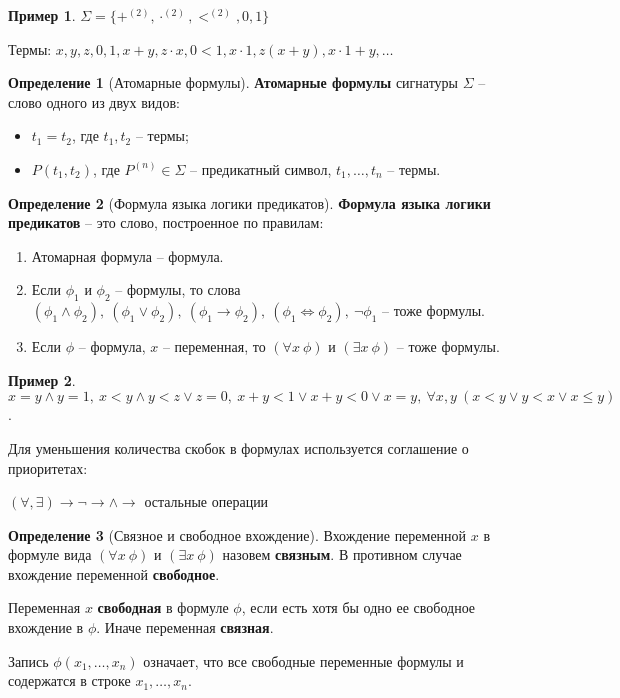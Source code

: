 \documentclass{report}
\theoremstyle{definition}
\newtheorem{definition}{Определение}[section]
\newtheorem{example}{Пример}
\begin{document}
\begin{example}
    $\Sigma = \{+^{(2)},\cdot^{(2)},<^{(2)},0,1\}$

    Термы: $x,y,z,0,1,x+y,z\cdot x, 0 < 1, x\cdot 1, z(x+y), x\cdot 1 + y,\ldots$
\end{example}

\begin{definition}[Атомарные формулы]
    \textbf{Атомарные формулы} сигнатуры $\Sigma$ -- слово одного из двух видов:
    \begin{itemize}
        \item $t_1 = t_2$, где $t_1,t_2$ -- термы;
        \item $P(t_1,t_2)$, где $P^{(n)} \in \Sigma$ -- предикатный символ, $t_1,\ldots,t_n$ -- термы.
    \end{itemize}
\end{definition}

\begin{definition}[Формула языка логики предикатов]
    \textbf{Формула языка логики предикатов} -- это слово, построенное по правилам:
    \begin{enumerate}
        \item Атомарная формула -- формула.
        \item Если $\phi_1$ и $\phi_2$ -- формулы, то слова $(\phi_1 \land \phi_2), \ (\phi_1 \lor \phi_2), \ (\phi_1 \rightarrow \phi_2), \ (\phi_1 \iff \phi_2), \ \lnot\phi_1$ -- тоже формулы.
        \item Если $\phi$ -- формула, $x$ -- переменная, то $(\forall x \ \phi)$ и $(\exists x \ \phi)$ -- тоже формулы.
    \end{enumerate}
\end{definition}

\begin{example}
    $x = y \land y = 1, \ x < y \land y < z \lor z = 0, \ x + y < 1 \lor x + y < 0 \lor x = y, \ \forall x,y \ (x < y \lor y < x \lor x \leqslant y)$.
\end{example}

Для уменьшения количества скобок в формулах используется соглашение о приоритетах:
\begin{center}
    $(\forall,\exists) \rightarrow \lnot \rightarrow \land \rightarrow$ остальные операции
\end{center}

\begin{definition}[Связное и свободное вхождение]
    Вхождение переменной $x$ в формуле вида $(\forall x \ \phi)$ и $(\exists x \ \phi)$ назовем \textbf{связным}. В противном случае вхождение переменной \textbf{свободное}.

    Переменная $x$ \textbf{свободная} в формуле $\phi$, если есть хотя бы одно ее свободное вхождение в $\phi$. Иначе переменная \textbf{связная}.

    Запись $\phi(x_1,\ldots,x_n)$ означает, что все свободные переменные формулы и содержатся в строке $x_1,\ldots,x_n$.
\end{definition}
\end{document}
